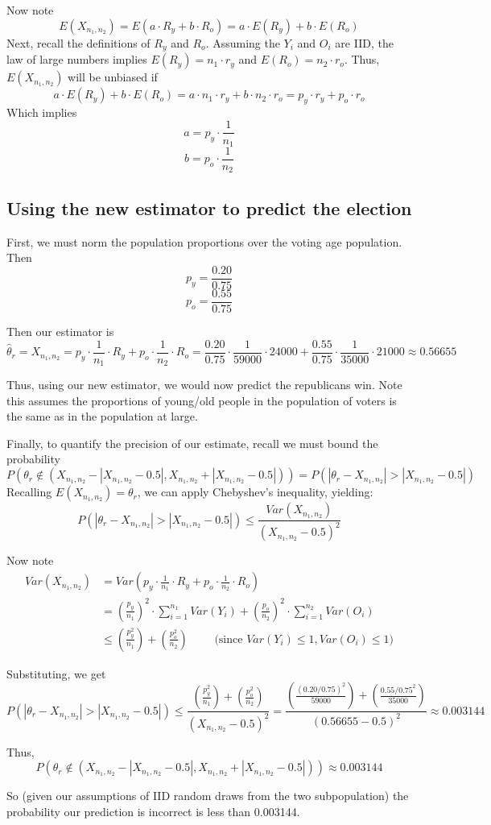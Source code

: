 \documentclass[paper=a4, fontsize=11pt]{scrartcl} %
\numberwithin{equation}{section} %
\numberwithin{figure}{section} %
\numberwithin{table}{section} %
\begin{document}
Now note
\[ E(X_{n_1, n_2}) = E(a\cdot R_y + b \cdot R_o) = a\cdot E(R_y) + b \cdot E(R_o) \]
Next, recall the definitions of $R_y$ and $R_o$. Assuming the $Y_i$ and $O_i$ are IID, the law of large numbers implies $E(R_y) = n_1 \cdot r_y$ and $E(R_o) = n_2 \cdot r_o$.
Thus, $E(X_{n_1, n_2})$ will be unbiased if
\[a\cdot E(R_y) + b \cdot E(R_o) = a\cdot  n_1 \cdot r_y + b \cdot n_2 \cdot r_o = p_y \cdot r_y + p_o \cdot r_o\]
Which implies
\[ a = p_y \cdot \frac{1}{n_1} \]
\[ b = p_o \cdot \frac{1}{n_2} \]


\subsection{Using the new estimator to predict the election}

First, we must norm the population proportions over the voting age population. Then
\[p_y = \frac{0.20}{0.75}\]
\[p_o = \frac{0.55}{0.75}\]

Then our estimator is
\[\hat{\theta}_r = X_{n_1, n_2} =  p_y \cdot \frac{1}{n_1} \cdot R_y + p_o \cdot \frac{1}{n_2} \cdot R_o = \frac{0.20}{0.75} \cdot \frac{1}{59000} \cdot 24000 + \frac{0.55}{0.75} \cdot \frac{1}{35000} \cdot 21000 \approx 0.56655\] 

Thus, using our new estimator, we would now predict the republicans win. Note this assumes the proportions of young/old people in the population of voters is the same as in the population at large.

Finally, to quantify the precision of our estimate, recall we must bound the probability 
\[P\left( \theta_r \notin (X_{n_1, n_2} - |X_{n_1, n_2} - 0.5|,  X_{n_1, n_2} +  |X_{n_1, n_2} - 0.5| )\right) = P(|\theta_r - X_{n_1, n_2}| > |X_{n_1, n_2} - 0.5| )\]
Recalling $E(X_{n_1, n_2}) = \theta_r$, we can apply Chebyshev's inequality, yielding:
\[P(|\theta_r - X_{n_1, n_2}| > |X_{n_1, n_2} - 0.5| ) \leq \frac{Var(X_{n_1, n_2})}{(X_{n_1, n_2}-0.5)^2}\]

Now note
\begin{align*}
Var(X_{n_1, n_2}) &= Var(p_y \cdot \frac{1}{n_1} \cdot R_y + p_o \cdot \frac{1}{n_2} \cdot R_o)\\
   &= \left(\frac{p_y}{n_1}\right)^2 \cdot \sum_{i = 1}^{n_1}Var(Y_i) + \left(\frac{p_o}{n_2}\right)^2 \cdot \sum_{i = 1}^{n_2}Var(O_i) \\
   &\leq \left(\frac{p_y^2}{n_1}\right) + \left(\frac{p_o^2}{n_2}\right) \qquad{}\textrm{ (since }Var(Y_i)\leq1, Var(O_i) \leq 1)
\end{align*}

Substituting, we get
\[ P(|\theta_r - X_{n_1, n_2}| > |X_{n_1, n_2} - 0.5| ) \leq \frac{\left(\frac{p_y^2}{n_1}\right) + \left(\frac{p_o^2}{n_2}\right)}{(X_{n_1, n_2}-0.5)^2} = \frac{\left(\frac{(0.20/0.75)^2}{59000}\right) + \left(\frac{0.55/0.75^2}{35000}\right)}{(0.56655-0.5)^2} \approx 0.003144 \]

Thus, 
\[P\left( \theta_r \notin (X_{n_1, n_2} - |X_{n_1, n_2} - 0.5|,  X_{n_1, n_2} +  |X_{n_1, n_2} - 0.5| )\right) \approx 0.003144\]

So (given our assumptions of IID random draws from the two subpopulation) the probability our prediction is incorrect is less than 0.003144.
\end{document}
